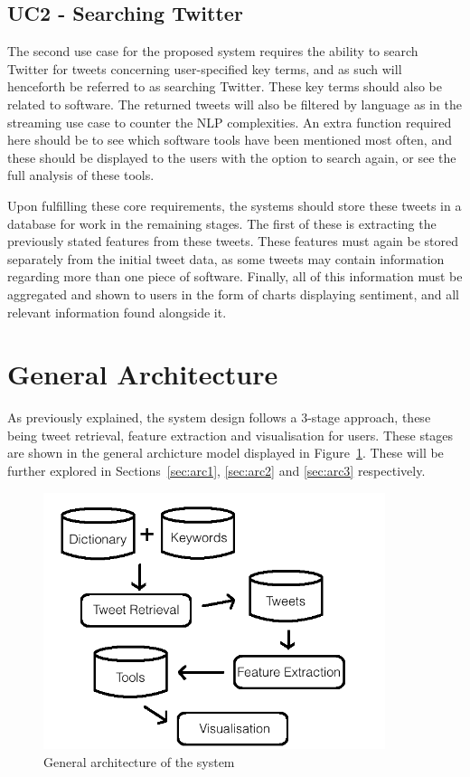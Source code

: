 \subsection[Use Case 2]{UC2 - Searching Twitter}
The second use case for the proposed system requires the ability to search Twitter for tweets concerning user-specified key terms, and as such will henceforth be referred to as searching Twitter. These key terms should also be related to software. The returned tweets will also be filtered by language as in the streaming use case to counter the NLP complexities. An extra function required here should be to see which software tools have been mentioned most often, and these should be displayed to the users with the option to search again, or see the full analysis of these tools.


Upon fulfilling these core requirements, the systems should store these tweets in a database for work in the remaining stages. The first of these is extracting the previously stated features from these tweets. These features must again be stored separately from the initial tweet data, as some tweets may contain information regarding more than one piece of software. Finally, all of this information must be aggregated and shown to users in the form of charts displaying sentiment, and all relevant information found alongside it.


\section{General Architecture}
As previously explained, the system design follows a 3-stage approach, these being tweet retrieval, feature extraction and visualisation for users. These stages are shown in the general archicture model displayed in Figure~\ref{fig:general}. These will be further explored in Sections~\ref{sec:arc1}, \ref{sec:arc2} and \ref{sec:arc3} respectively.

\begin{figure}[h]
\begin{center}
\includegraphics[width=10cm]{design}
\end{center}
\caption{General architecture of the system}
\label{fig:general}
\end{figure}

